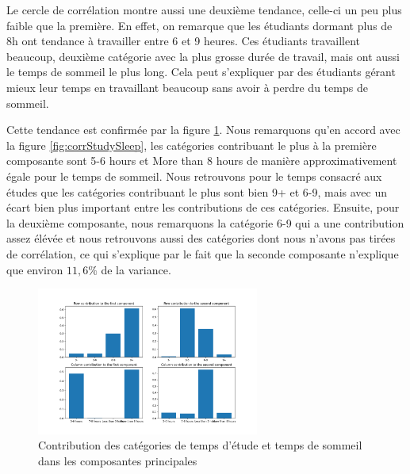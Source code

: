 Le cercle de corrélation montre aussi une deuxième tendance, celle-ci un peu plus faible que la première.
En effet, on remarque que les étudiants dormant plus de 8h ont tendance à travailler entre 6 et 9 heures.
Ces étudiants travaillent beaucoup, deuxième catégorie avec la plus grosse durée de travail, mais ont aussi le temps de sommeil le plus long.
Cela peut s'expliquer par des étudiants gérant mieux leur temps en travaillant beaucoup sans avoir à perdre du temps de sommeil.


Cette tendance est confirmée par la figure \ref{fig:contribStudySleep}.
Nous remarquons qu'en accord avec la figure \ref{fig:corrStudySleep}, les catégories contribuant le plus à la première composante sont 5-6 hours et More than 8 hours de manière approximativement égale pour le temps de sommeil.
Nous retrouvons pour le temps consacré aux études que les catégories contribuant le plus sont bien 9+ et 6-9, mais avec un écart bien plus important entre les contributions de ces catégories.
Ensuite, pour la deuxième composante, nous remarquons la catégorie 6-9 qui a une contribution assez élévée et nous retrouvons aussi des catégories dont nous n'avons pas tirées de corrélation, ce qui s'explique par le fait que la seconde composante n'explique que environ $11,6\%$ de la variance.

\begin{figure}[H]
    \begin{center}
      \includegraphics[width=0.65\textwidth]{Images/Study_Sleep_all/RowColumnsContributions.png}
    \end{center}
    \caption{Contribution des catégories de temps d'étude et temps de sommeil dans les composantes principales}
    \label{fig:contribStudySleep}
  \end{figure}




